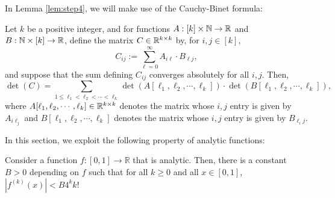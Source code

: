 In Lemma \ref{lem:step4}, we will make use of the Cauchy-Binet formula:

\begin{lemma}\label{lem:cauchy-binet}
Let $k$ be a positive integer, and for functions $A : [k] \times {\mathbb N} \to {\mathbb R}$ and $B : {\mathbb N} \times [k] \to {\mathbb R}$, define the matrix $C \in {\mathbb R}^{k \times k}$ by, for $i,j \in [k]$, $$C_{ij} := \sum_{\ell=0}^\infty A_{i\ell} \cdot B_{\ell j},$$
and suppose that the sum defining $C_{ij}$ converges absolutely for all $i,j$. Then,
$$\det(C) = \sum_{1 \leq \ell_1 < \ell_2 < \cdots < \ell_k} \det(A[\ell_1, \ell_2, \cdots, \ell_k]) \cdot \det(B[\ell_1, \ell_2, \cdots, \ell_k]),$$
where $A[\ell_1, \ell_2, \cdots, \ell_k] \in {\mathbb R}^{k \times k}$ denotes the matrix whose $i,j$ entry is given by $A_{i\ell_j}$ and $B[\ell_1, \ell_2, \cdots, \ell_k]$ denotes the matrix whose $i,j$ entry is given by $B_{\ell_i j}$.
\end{lemma}



In this section, we exploit the following property of analytic functions:

\begin{proposition}\label{prop:derivs}
Consider a function $f:[0,1]\rightarrow \mathbb{R}$ that is analytic. Then, there is a constant $B > 0$ depending on $f$ such that for all $k \ge 0$ and all $x\in [0,1]$, $|f^{(k)}(x)| < B 4^k k!$
\end{proposition}

